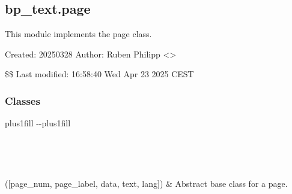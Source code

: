 \documentclass[letterpaper,10pt,english]{sphinxmanual}
\begin{document}
\sphinxstepscope


\subsection{bp\_text.page}
\label{\detokenize{generated/bp_text.page:module-bp_text.page}}\label{\detokenize{generated/bp_text.page:bp-text-page}}\label{\detokenize{generated/bp_text.page::doc}}
\sphinxAtStartPar
This module implements the page class.

\sphinxAtStartPar
Created: 2025\sphinxhyphen{}03\sphinxhyphen{}28
Author: Ruben Philipp \textless{}\textgreater{}

\sphinxAtStartPar
\$\$ Last modified:  16:58:40 Wed Apr 23 2025 CEST
\subsubsection*{Classes}


\begin{savenotes}
\sphinxatlongtablestart
\sphinxthistablewithglobalstyle
\sphinxthistablewithnovlinesstyle
\makeatletter
  \LTleft \@totalleftmargin plus1fill
  \LTright\dimexpr\columnwidth-\@totalleftmargin-\linewidth\relax plus1fill
\makeatother
\begin{longtable}{}
\sphinxtoprule
\endfirsthead

\\
\sphinxtoprule
\endhead

\sphinxbottomrule
{}\\
\endfoot

\endlastfoot
\sphinxtableatstartofbodyhook

\sphinxAtStartPar
{\hyperref[\detokenize{generated/bp_text.page:bp_text.page.Page}]{}}({[}page\_num, page\_label, data, text, lang{]})
&
\sphinxAtStartPar
Abstract base class for a page.
\\
\sphinxbottomrule
\end{longtable}
\sphinxtableafterendhook
\sphinxatlongtableend
\end{savenotes}
\end{document}
